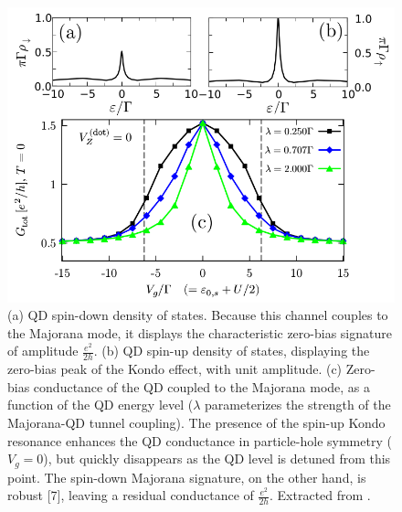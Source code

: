 \begin{figure}[ht]
\centering
\includegraphics[scale=0.4]{IMAGES/Kondo-Majorana Conductivity.png}
\caption{\label{Fig-Kondo-Majorana conductance}(a) QD spin-down
density of states. Because this channel couples to the Majorana mode,
it displays the characteristic zero-bias signature of amplitude
$\frac{e^{2}}{2h}$. (b) QD spin-up density of states,
displaying the zero-bias peak of the Kondo effect, with
unit amplitude. (c) Zero-bias conductance of the QD coupled
to the Majorana mode, as a function of the QD energy level ($\lambda$
parameterizes the strength of the Majorana-QD tunnel coupling).
The presence of the spin-up Kondo resonance enhances the
QD conductance in particle-hole symmetry ($V_{g}=0$),
but quickly disappears as the QD level is detuned from this point.
The spin-down Majorana signature, on the other hand, is
robust {[}7{]}, leaving a residual conductance of $\frac{e^{2}}{2h}$.
Extracted from \citep{ruiz-tijerina_interaction_2015}.}
\end{figure}



